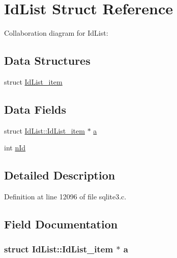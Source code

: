 \hypertarget{struct_id_list}{}\section{Id\+List Struct Reference}
\label{struct_id_list}


Collaboration diagram for Id\+List\+:
\subsection*{Data Structures}
\begin{DoxyCompactItemize}
\item 
struct \hyperlink{struct_id_list_1_1_id_list__item}{Id\+List\+\_\+item}
\end{DoxyCompactItemize}
\subsection*{Data Fields}
\begin{DoxyCompactItemize}
\item 
struct \hyperlink{struct_id_list_1_1_id_list__item}{Id\+List\+::\+Id\+List\+\_\+item} $\ast$ \hyperlink{struct_id_list_adecee128304df14e03b5bc57bad60ebe}{a}
\item 
int \hyperlink{struct_id_list_a704996c74087cf2da6dc57c77927c755}{n\+Id}
\end{DoxyCompactItemize}


\subsection{Detailed Description}


Definition at line 12096 of file sqlite3.\+c.



\subsection{Field Documentation}
\hypertarget{struct_id_list_adecee128304df14e03b5bc57bad60ebe}{}
\subsubsection[{a}]{\setlength{\rightskip}{0pt plus 5cm}struct {\bf Id\+List\+::\+Id\+List\+\_\+item} $\ast$ a}\label{struct_id_list_adecee128304df14e03b5bc57bad60ebe}
\hypertarget{struct_id_list_a704996c74087cf2da6dc57c77927c755}{}
